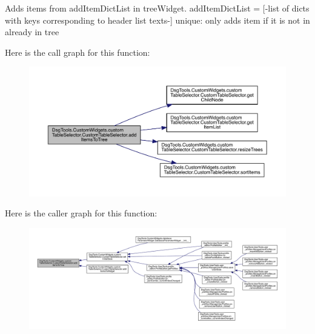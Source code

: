 \begin{DoxyVerb}Adds items from addItemDictList in treeWidget.
addItemDictList = [-list of dicts with keys corresponding to header list texts-]
unique: only adds item if it is not in already in tree
\end{DoxyVerb}
 Here is the call graph for this function\+:
\nopagebreak
\begin{figure}[H]
\begin{center}
\leavevmode
\includegraphics[width=350pt]{class_dsg_tools_1_1_custom_widgets_1_1custom_table_selector_1_1_custom_table_selector_a28820966afdddb28abaa28306ff151a0_cgraph}
\end{center}
\end{figure}
Here is the caller graph for this function\+:
\nopagebreak
\begin{figure}[H]
\begin{center}
\leavevmode
\includegraphics[width=350pt]{class_dsg_tools_1_1_custom_widgets_1_1custom_table_selector_1_1_custom_table_selector_a28820966afdddb28abaa28306ff151a0_icgraph}
\end{center}
\end{figure}
\mbox{\label{class_dsg_tools_1_1_custom_widgets_1_1custom_table_selector_1_1_custom_table_selector_a58bd65d3468ed434e497e63fc2677ffa}} 
